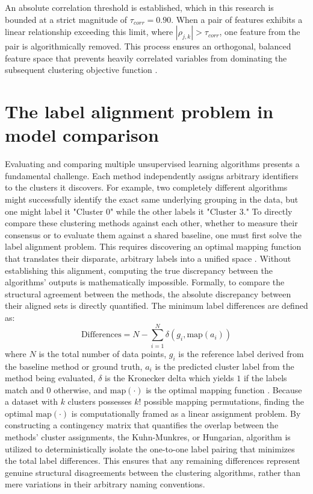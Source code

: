         An absolute correlation threshold is established, which in this research is bounded at a strict magnitude of $\tau_{corr} = 0.90$.
        When a pair of features exhibits a linear relationship exceeding this limit, where $|\rho_{j,k}| > \tau_{corr}$, one feature from the pair is algorithmically removed.
        This process ensures an orthogonal, balanced feature space that prevents heavily correlated variables from dominating the subsequent clustering objective function \cite{mangal_comparative_2018}.
        
    \section{The label alignment problem in model comparison}
    \label{sec:hungarian}
    Evaluating and comparing multiple unsupervised learning algorithms presents a fundamental challenge.
    Each method independently assigns arbitrary identifiers to the clusters it discovers.
    For example, two completely different algorithms might successfully identify the exact same underlying grouping in the data, but one might label it "Cluster 0" while the other labels it "Cluster 3."
    To directly compare these clustering methods against each other, whether to measure their consensus or to evaluate them against a shared baseline, one must first solve the label alignment problem.
    This requires discovering an optimal mapping function that translates their disparate, arbitrary labels into a unified space \cite{sieranoja_clustering_2024}.
    Without establishing this alignment, computing the true discrepancy between the algorithms' outputs is mathematically impossible.
    Formally, to compare the structural agreement between the methods, the absolute discrepancy between their aligned sets is directly quantified.
    The minimum label differences are defined as:
    \begin{equation}
        \text{Differences} = N - \sum_{i=1}^{N} \delta(g_i, \text{map}(a_i))
    \end{equation}
    where $N$ is the total number of data points, $g_i$ is the reference label derived from the baseline method or ground truth, $a_i$ is the predicted cluster label from the method being evaluated, $\delta$ is the Kronecker delta which yields $1$ if the labels match and $0$ otherwise, and $\text{map}(\cdot)$ is the optimal mapping function \cite{sieranoja_clustering_2024}.
    Because a dataset with $k$ clusters possesses $k!$ possible mapping permutations, finding the optimal $\text{map}(\cdot)$ is computationally framed as a linear assignment problem.
    By constructing a contingency matrix that quantifies the overlap between the methods' cluster assignments, the Kuhn-Munkres, or Hungarian, algorithm is utilized to deterministically isolate the one-to-one label pairing that minimizes the total label differences.
    This ensures that any remaining differences represent genuine structural disagreements between the clustering algorithms, rather than mere variations in their arbitrary naming conventions.

